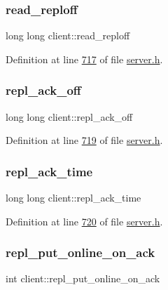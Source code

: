\subsubsection{\texorpdfstring{read\+\_\+reploff}{read\_reploff}}
{\footnotesize\ttfamily long long client\+::read\+\_\+reploff}



Definition at line \hyperlink{server_8h_source_l00717}{717} of file \hyperlink{server_8h_source}{server.\+h}.

\mbox{\label{structclient_aed7c294574064dbf283d34be74f62045}} 
\subsubsection{\texorpdfstring{repl\+\_\+ack\+\_\+off}{repl\_ack\_off}}
{\footnotesize\ttfamily long long client\+::repl\+\_\+ack\+\_\+off}



Definition at line \hyperlink{server_8h_source_l00719}{719} of file \hyperlink{server_8h_source}{server.\+h}.

\mbox{\label{structclient_a3140c1f09c80b09020e200d6489a0677}} 
\subsubsection{\texorpdfstring{repl\+\_\+ack\+\_\+time}{repl\_ack\_time}}
{\footnotesize\ttfamily long long client\+::repl\+\_\+ack\+\_\+time}



Definition at line \hyperlink{server_8h_source_l00720}{720} of file \hyperlink{server_8h_source}{server.\+h}.

\mbox{\label{structclient_ac372560ae254512b93d940f4c882dc6e}} 
\subsubsection{\texorpdfstring{repl\+\_\+put\+\_\+online\+\_\+on\+\_\+ack}{repl\_put\_online\_on\_ack}}
{\footnotesize\ttfamily int client\+::repl\+\_\+put\+\_\+online\+\_\+on\+\_\+ack}



